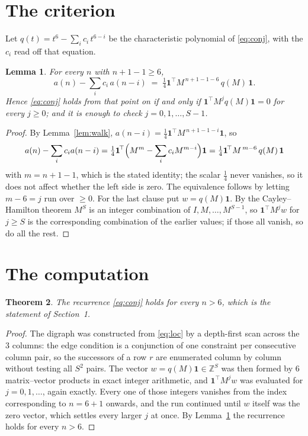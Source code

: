 \documentclass[11pt,a4paper]{article}
\theoremstyle{plain}
\newtheorem{theorem}{Theorem}
\newtheorem{lemma}[theorem]{Lemma}
\theoremstyle{definition}
\begin{document}
\section{The criterion}

Let $q(t)=t^{6}-\sum_i c_i\,t^{6-i}$ be the characteristic polynomial of
\eqref{eq:conj}, with the $c_i$ read off that equation.

\begin{lemma}\label{lem:crit}
For every $n$ with $n+1-1\ge6$,
\[
a(n)-\sum_i c_i\,a(n-i)\;=\;\tfrac1{4}\mathbf{1}^{\!\top}M^{\,n+1-1-6}\,q(M)\,\mathbf{1} .
\]
Hence \eqref{eq:conj} holds from that point on if and only if
$\mathbf{1}^{\!\top}M^{j}q(M)\mathbf{1}=0$ for every $j\ge0$; and it is enough to check
$j=0,1,\dots,S-1$.
\end{lemma}

\begin{proof}
By Lemma~\ref{lem:walk}, $a(n-i)=\tfrac1{4}\mathbf{1}^{\!\top}M^{\,n+1-1-i}\mathbf{1}$, so
\[
a(n)-\sum_i c_i a(n-i)
=\tfrac1{4}\mathbf{1}^{\!\top}\Bigl(M^{m}-\sum_i c_i M^{m-i}\Bigr)\mathbf{1}
=\tfrac1{4}\mathbf{1}^{\!\top}M^{\,m-6}\,q(M)\,\mathbf{1}
\]
with $m=n+1-1$, which is the stated identity; the scalar $\tfrac1{4}$ never vanishes, so
it does not affect whether the left side is zero. The equivalence follows by letting
$m-6=j$ run over $\ge0$. For the last clause put $w=q(M)\mathbf{1}$. By the
Cayley--Hamilton theorem $M^{S}$ is an integer combination of $I,M,\dots,M^{S-1}$, so
$\mathbf{1}^{\!\top}M^{j}w$ for $j\ge S$ is the corresponding combination of the earlier
values; if those all vanish, so do all the rest.
\end{proof}

\section{The computation}

\begin{theorem}
The recurrence \eqref{eq:conj} holds for every $n>6$, which is the statement of
Section~1.
\end{theorem}

\begin{proof}
The digraph was constructed from \eqref{eq:loc} by a depth-first scan across the $3$
columns: the edge condition is a conjunction of one constraint per consecutive column
pair, so the successors of a row $r$ are enumerated column by column without testing all
$S^2$ pairs. The vector $w=q(M)\mathbf{1}\in\mathbb{Z}^{S}$ was then formed by $6$
matrix--vector products in exact integer arithmetic, and $\mathbf{1}^{\!\top}M^{j}w$ was
evaluated for $j=0,1,\dots$, again exactly. Every one of those integers vanishes from the
index corresponding to $n=6+1$ onwards, and the run continued until $w$ itself was the
zero vector, which settles every larger $j$ at once. By Lemma~\ref{lem:crit} the recurrence
holds for every $n>6$.
\end{proof}
\end{document}

